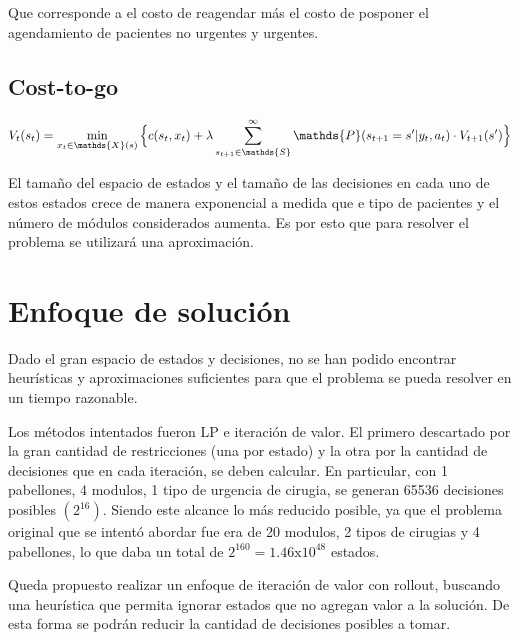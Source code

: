 \documentclass[letterpaper,10pt]{article}
\begin{document}
    Que corresponde a el costo de reagendar más el costo de posponer el agendamiento de pacientes no urgentes y urgentes.
    
\subsection*{Cost-to-go}

    $$ V_t(s_t) = \min_{x_t \in \mathds{X}(s)} \Big{\{}c(s_t, x_t) + \lambda\sum\limits_{s_{t+1} \in \mathds{S}}^{\infty}\mathds{P}(s_{t+1}=s' | y_t, a_t) \cdot V_{t+1}(s')\Big{\}} $$
    

El tamaño del espacio de estados y el tamaño de las decisiones en cada uno de estos estados crece de manera exponencial a medida que e tipo de pacientes y el número de módulos considerados aumenta. Es por esto que para resolver el problema se utilizará una aproximación.


\section*{Enfoque de solución}    

Dado el gran espacio de estados y decisiones, no se han podido encontrar heurísticas y aproximaciones suficientes para que el problema se pueda resolver en un tiempo razonable.

Los métodos intentados fueron LP e iteración de valor. El primero descartado por la gran cantidad de restricciones (una por estado) y la otra por la cantidad de decisiones que en cada iteración, se deben calcular.
En particular, con 1 pabellones, 4 modulos, 1 tipo de urgencia de cirugia, se generan 65536 decisiones posibles $(2^{16})$. Siendo este alcance lo más reducido posible, ya que el problema original que se intentó abordar fue era de 20 modulos, 2 tipos de cirugias y 4 pabellones, lo que daba un total de $2^{160} = 1.46\text{x}10^{48}$ estados.

Queda propuesto realizar un enfoque de iteración de valor con rollout, buscando una heurística que permita ignorar estados que no agregan valor a la solución. De esta forma se podrán reducir la cantidad de decisiones posibles a tomar.



\small{
	
	
}
\end{document}
